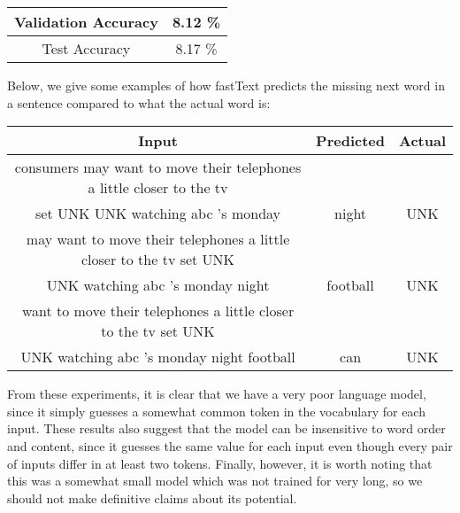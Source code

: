 \documentclass[a4paper]{article}
\begin{document}
\begin{center}
\begin{tabular}{ |c|c| } 
 \hline
 Validation Accuracy & 8.12 \% \\ \hline
 Test Accuracy & 8.17 \% \\
 \hline
\end{tabular}
\end{center}

Below, we give some examples of how fastText predicts the missing next word in a sentence compared to what the actual word is:

\begin{center}
\begin{tabular}{ |c|c|c|} 
 \hline
Input & Predicted & Actual \\ \hline
consumers may want to move their telephones a little closer to the tv \\ set UNK UNK watching abc 's monday & night & UNK \\ \hline
may want to move their telephones a little closer to the tv set UNK \\ UNK watching abc 's monday night & football & UNK \\ \hline
want to move their telephones a little closer to the tv set UNK \\ UNK watching abc 's monday night football & can & UNK \\ \hline
\end{tabular}
\end{center}

From these experiments, it is clear that we have a very poor language model, since it simply guesses a somewhat common token in the vocabulary for each input. These results also suggest that the model can be insensitive to word order and content, since it guesses the same value for each input even though every pair of inputs differ in at least two tokens. Finally, however, it is worth noting that this was a somewhat small model which was not trained for very long, so we should not make definitive claims about its potential.
\end{document}
